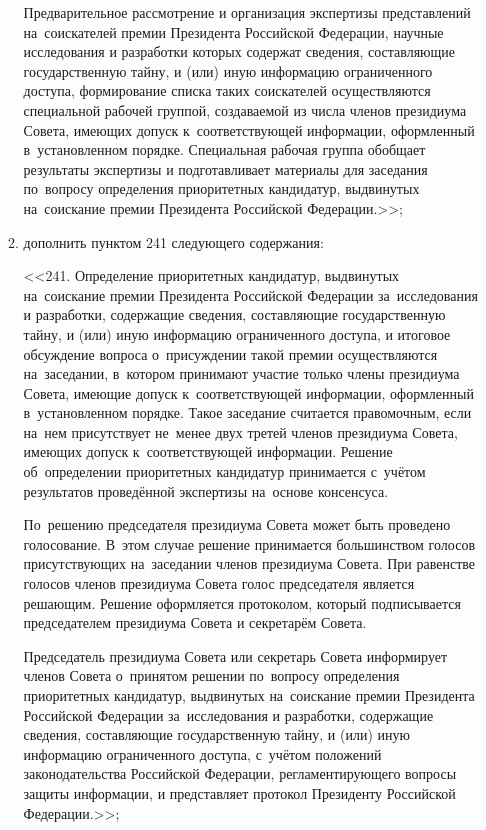 \documentclass[14pt, a4paper]{extarticle}
\begin{document}
\begin{enumerate}
\begin{enumerate}[label=\asbuk*), ref=\asbuk*]
		Предварительное рассмотрение и организация экспертизы представлений на~соискателей премии Президента Российской Федерации, научные исследования и разработки которых содержат сведения, составляющие государственную тайну, и (или) иную информацию ограниченного доступа, формирование списка таких соискателей осуществляются специальной рабочей группой, создаваемой из числа членов президиума Совета, имеющих допуск к~соответствующей информации, оформленный в~установленном порядке. Специальная рабочая группа обобщает результаты экспертизы и подготавливает материалы для заседания по~вопросу определения приоритетных кандидатур, выдвинутых на~соискание премии Президента Российской Федерации.>>;
		
		\item дополнить пунктом 241 следующего содержания:
		
		<<241. Определение приоритетных кандидатур, выдвинутых на~соискание премии Президента Российской Федерации за~исследования и разработки, содержащие сведения, составляющие государственную тайну, и (или) иную информацию ограниченного доступа, и итоговое обсуждение вопроса о~присуждении такой премии осуществляются на~заседании, в~котором принимают участие только члены президиума Совета, имеющие допуск к~соответствующей информации, оформленный в~установленном порядке. Такое заседание считается правомочным, если на~нем присутствует не~менее двух третей членов президиума Совета, имеющих допуск к~соответствующей информации. Решение об~определении приоритетных кандидатур принимается с~учётом результатов проведённой экспертизы на~основе консенсуса.
		
		По~решению председателя президиума Совета может быть проведено голосование. В~этом случае решение принимается большинством голосов присутствующих на~заседании членов президиума Совета. При равенстве голосов членов президиума Совета голос председателя является решающим. Решение оформляется протоколом, который подписывается председателем президиума Совета и секретарём Совета.
		
		Председатель президиума Совета или секретарь Совета информирует членов Совета о~принятом решении по~вопросу определения приоритетных кандидатур, выдвинутых на~соискание премии Президента Российской Федерации за~исследования и разработки, содержащие сведения, составляющие государственную тайну, и (или) иную информацию ограниченного доступа, с~учётом положений законодательства Российской Федерации, регламентирующего вопросы защиты информации, и представляет протокол Президенту Российской Федерации.>>;
		

\end{enumerate}
\end{enumerate}
\end{document}
